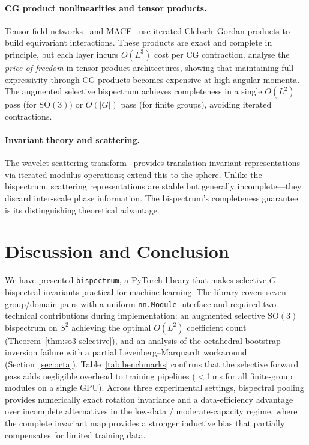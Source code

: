 \documentclass{article}
\theoremstyle{definition}
\theoremstyle{remark}
\newcommand{\SO}{\mathrm{SO}}
\theoremstyle{definition}
\begin{document}
\paragraph{CG product nonlinearities and tensor products.}
Tensor field networks~\citep{thomas2018tensor} and
MACE~\citep{batatia2022mace} use iterated Clebsch--Gordan products
to build equivariant interactions. These products are exact and complete
in principle, but each layer incurs $O(L^3)$ cost per CG contraction.
\citet{xie2025price} analyse the \emph{price of freedom} in tensor
product architectures, showing that maintaining full expressivity through
CG products becomes expensive at high angular momenta.
The augmented selective bispectrum achieves completeness in a single $O(L^2)$
pass (for $\SO(3)$) or $O(|G|)$ pass (for finite groups), avoiding
iterated contractions.

\paragraph{Invariant theory and scattering.}
The wavelet scattering transform~\citep{mallat2012scattering} provides
translation-invariant representations via iterated modulus operations;
\citet{esteves2018spherical} extend this to the sphere. Unlike the
bispectrum, scattering representations are stable but generally
incomplete---they discard inter-scale phase information.
The bispectrum's completeness guarantee~\citep{kakarala2012bispectrum} is its
distinguishing theoretical advantage.

\section{Discussion and Conclusion}
\label{sec:discussion}

We have presented \texttt{bispectrum}, a PyTorch library that makes selective
$G$-bispectral invariants practical for machine learning. The library covers
seven group/domain pairs with a uniform \texttt{nn.Module} interface and
required two technical contributions during implementation: an augmented
selective $\SO(3)$ bispectrum on $S^2$ achieving the optimal $O(L^2)$
coefficient count (Theorem~\ref{thm:so3-selective}), and an analysis of
the octahedral bootstrap inversion failure with a partial Levenberg--Marquardt
workaround (Section~\ref{sec:octa}). Table~\ref{tab:benchmarks} confirms that the
selective forward pass adds negligible overhead to training pipelines
($<$1\,ms for all finite-group modules on a single GPU). Across three
experimental settings, bispectral pooling provides numerically exact rotation
invariance and a data-efficiency advantage over incomplete alternatives in
the low-data / moderate-capacity regime, where the complete invariant map
provides a stronger inductive bias that partially compensates for
limited training data.
\end{document}
